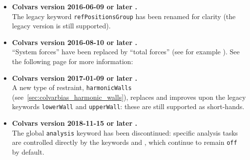 \begin{itemize}

\item \textbf{Colvars version 2016-06-09 or later .}\\
  The legacy keyword \texttt{refPositionsGroup} has been renamed  for clarity (the legacy version is still supported).

\item \textbf{Colvars version 2016-08-10 or later .}\\
  ``System forces'' have been replaced by ``total forces'' (see for example ).
  See the following page for more information:\\

\item \textbf{Colvars version 2017-01-09 or later .}\\
  A new type of restraint, \texttt{harmonicWalls} (see~\ref{sec:colvarbias_harmonic_walls}), replaces and improves upon the legacy keywords \texttt{lowerWall} and \texttt{upperWall}: these are still supported as short-hands.

\item \textbf{Colvars version 2018-11-15 or later .}\\
  The global \texttt{analysis} keyword has been discontinued: specific analysis tasks are controlled directly by the keywords  and , which continue to remain \texttt{off} by default.


\end{itemize}
